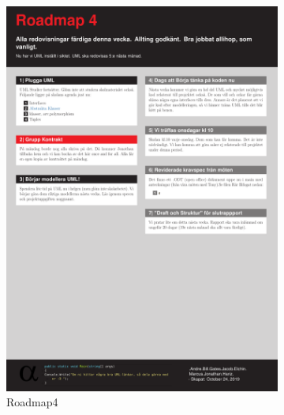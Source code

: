 \documentclass{article}
\theoremstyle{remark}                                         %
\begin{document}
\begin{figure}
\begin{subfigure}[b]{0.3\textwidth}
        \includegraphics[width=\textwidth]{img/Roadmap4.pdf}
        \caption{Roadmap4}
        \label{fig:road4}
    \end{subfigure}    
    \begin{subfigure}[b]{0.3\textwidth}

\end{subfigure}
\end{figure}
\end{document}
